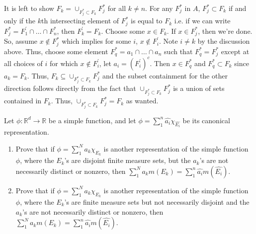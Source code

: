\documentclass[12pt]{article}
\newcommand{\R}{\mathbb{R}}
\newenvironment{solution}[2][Solution]{\begin{trivlist}
\item[\hskip \labelsep {\bfseries #1}]}{\end{trivlist}}
\newenvironment{problem}[2][Problem]{\begin{trivlist}
\item[\hskip \labelsep {\bfseries #1}\hskip \labelsep {\bfseries #2.}]}{\end{trivlist}}
\begin{document}
\begin{solution}{}
    It is left to show $F_k = \cup_{F_j^{*}\subset F_k} F_j^{*}$ for all $k\neq n$. For any $F_j^{*}$ in $A$, $F_j^{*}\subset F_k$
    if and only if the $k$th intersecting element of $F_j^{*}$ is equal to $F_k$ i.e. if we can write
    $F_j^{*} = F_1^{'} \cap \hdots \cap F_n^{*}$, then $F_k^{'} = F_k$. Choose some $x\in F_k$. If $x\in F_j^{*}$, then we're done.
    So, assume $x\not\in F_j^{*}$ which implies for some $i$, $x\not\in F_i^{'}$. Note $i\neq k$ by the discussion above.
    Thus, choose some element $F_q^{*} = a_1\cap\hdots\cap a_n$ such that $F_q^{*} = F_j^{*}$ except at all choices of $i$ for
    which $x\not\in F_i^{'}$, let $a_i = (F_i^{'})^c$. Then $x\in F_q^{*}$ and $F_q^{*}\subset F_k$ since $a_k = F_k$. Thus,
    $F_k\subseteq \cup_{F_j^{*}\subset F_k} F_j^{*}$ and the subset containment for the other direction follows directly from the
    fact that $\cup_{F_j^*\subset F_k} F_j^*$ is a union of sets contained in $F_k$. Thus, $\cup_{F_j^*\subset F_k} F_j^* = F_k$
    as wanted.
\end{solution}

\begin{problem}{2}

    Let $\phi:\R^d\to\R$ be a simple function, and let $\phi = \sum_1^n \hat{a_i}\chi_{\hat{E_i}}$ be its canonical
    representation.
    
    \begin{enumerate}
        \item Prove that if $\phi = \sum_1^N a_k\chi_{E_k}$ is another representation of the simple function $\phi$, where
        the $E_k$'s are disjoint finite measure sets, but the $a_k$'s are not necessarily distinct or nonzero, then
        $\sum_1^N a_km(E_k) = \sum_1^n \hat{a_i}m(\hat{E_i})$.
        
        \item Prove that if $\phi = \sum_1^N a_k\chi_{E_k}$ is another representation of the simple function $\phi$, where
        the $E_k$'s are finite measure sets but not necessarily disjoint and the $a_k$'s are not necessarily distinct or
        nonzero, then $\sum_1^N a_km(E_k) = \sum_1^n \hat{a_i}m(\hat{E_i})$. 
    \end{enumerate}
\end{problem}
\end{document}
